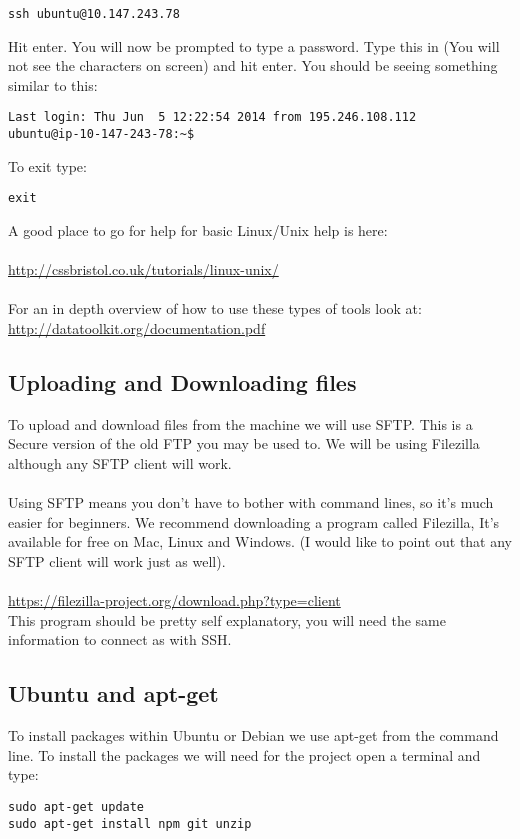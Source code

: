 \documentclass[twocolumn]{article}
\begin{document}
\begin{lstlisting}
ssh ubuntu@10.147.243.78
\end{lstlisting}
Hit enter. You will now be prompted to type a password. Type this in (You will not see the characters on screen) and hit enter. You should be seeing something similar to this:

\begin{lstlisting}
Last login: Thu Jun  5 12:22:54 2014 from 195.246.108.112
ubuntu@ip-10-147-243-78:~$
\end{lstlisting}
To exit type:
\begin{lstlisting}
exit
\end{lstlisting}

A good place to go for help for basic Linux/Unix help is here:\\
\\
\url{http://cssbristol.co.uk/tutorials/linux-unix/}\\
\\
For an in depth overview of how to use these types of tools look at:
\url{http://datatoolkit.org/documentation.pdf}

\subsection{Uploading and Downloading files}

To upload and download files from the machine we will use SFTP. This is a Secure version of the old FTP you may be used to. We will be using Filezilla although any SFTP client will work.\\
\\
Using SFTP means you don't have to bother with command lines, so it's much easier for beginners. We recommend downloading a program called Filezilla, It's available for free on Mac, Linux and Windows. (I would like to point out that any SFTP client will work just as well).\\
\\
\url{https://filezilla-project.org/download.php?type=client}\\
This program should be pretty self explanatory, you will need the same information to connect as with SSH.

\subsection{Ubuntu and apt-get}

To install packages within Ubuntu or Debian we use apt-get from the command line. To install the packages we will need for the project open a terminal and type:
\begin{lstlisting}
sudo apt-get update
sudo apt-get install npm git unzip
\end{lstlisting}
\end{document}
